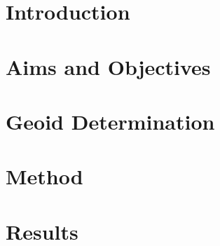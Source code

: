 \documentclass[english]{report}
\begin{document}

\tableofcontents


\pagebreak
\begingroup
\renewcommand{\cleardoublepage}{}
\renewcommand{\clearpage}{}
\chapter{Introduction}

\endgroup

\pagebreak
\begingroup
\renewcommand{\cleardoublepage}{}
\renewcommand{\clearpage}{}
\chapter{Aims and Objectives}

\endgroup

\pagebreak
\begingroup
\renewcommand{\cleardoublepage}{}
\renewcommand{\clearpage}{}
\chapter{Geoid Determination}

\endgroup

\pagebreak
\begingroup
\renewcommand{\cleardoublepage}{}
\renewcommand{\clearpage}{}
\chapter{Method}

\endgroup

\pagebreak
\begingroup
\renewcommand{\cleardoublepage}{}
\renewcommand{\clearpage}{}
\chapter{Results}

\endgroup





\renewcommand{\bibname}{References}

\end{document}
